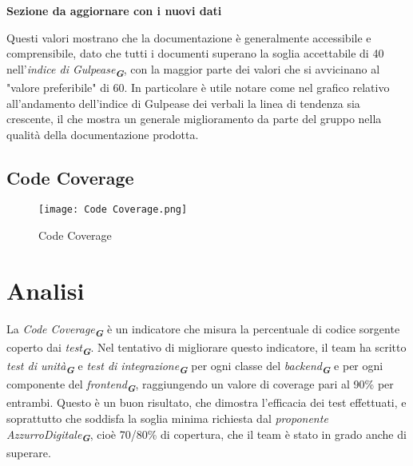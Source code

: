 \textbf{Sezione da aggiornare con i nuovi dati}

Questi valori mostrano che la documentazione è generalmente accessibile e comprensibile, 
dato che tutti i documenti superano la soglia accettabile di 40 nell'\emph{indice di Gulpease}\textsubscript{\textbf{\textit{G}}}, 
con la maggior parte dei valori che si avvicinano al "valore preferibile" di 60. 
In particolare è utile notare come nel grafico relativo all'andamento dell'indice di Gulpease dei verbali la linea di tendenza sia crescente,
il che mostra un generale miglioramento da parte del gruppo nella qualità della documentazione prodotta.

\newpage

\subsection{Code Coverage}
\label{subsec:Code Coverage}

\begin{figure}[h] 
    \centering
    \texttt{[image: Code Coverage.png]}
    \caption{Code Coverage} 
    \label{fig: Code Coverage}
\end{figure}

\section*{Analisi}
La \emph{Code Coverage}\textsubscript{\textbf{\textit{G}}} è un indicatore che misura la percentuale di codice sorgente coperto dai \emph{test}\textsubscript{\textbf{\textit{G}}}. Nel tentativo di migliorare questo indicatore, il team ha scritto \emph{test di unità}\textsubscript{\textbf{\textit{G}}} e \emph{test di integrazione}\textsubscript{\textbf{\textit{G}}} per ogni classe del \emph{backend}\textsubscript{\textbf{\textit{G}}} e per ogni componente del \emph{frontend}\textsubscript{\textbf{\textit{G}}}, raggiungendo un valore di coverage pari al 90\% per entrambi. Questo è un buon risultato, che dimostra l'efficacia dei test effettuati, e soprattutto che soddisfa la soglia minima richiesta dal \emph{proponente} \emph{AzzurroDigitale}\textsubscript{\textbf{\textit{G}}}, cioè 70/80\% di copertura, che il team è stato in grado anche di superare.
